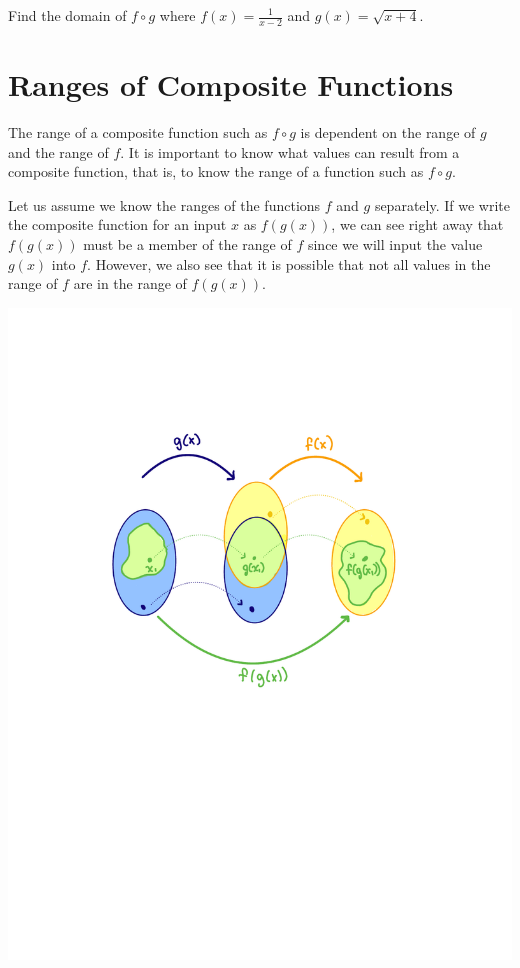 \documentclass{ximera}
\begin{document}
\begin{exploration}
Find the domain of $f \circ g$ where $f(x)=\frac{1}{x-2}$ and $g(x)=\sqrt{x+4}$.
\end{exploration}





\section{Ranges of Composite Functions}
The range of a composite function such as $f \circ g$ is dependent on the range of $g$ and the range of $f$. It is important to know what values can result from a composite function, that is, to know the range of a function such as $f  \circ g$. 

Let us assume we know the ranges of the functions $f$ and $g$ separately. If we write the composite function for an input $x$ as $f(g(x))$, we can see right away that $f(g(x))$ must be a member of the range of $f$ since we will input the value $g(x)$ into $f$. However, we also see that it is possible that not all values in the range of $f$ are in the range of $f(g(x))$.  

\begin{image}
\includegraphics{CompDom1}
\end{image}
\end{document}

